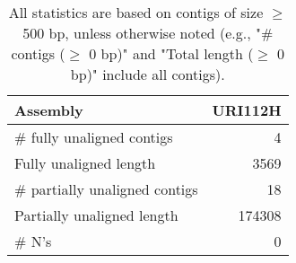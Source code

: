 \documentclass[12pt,a4paper]{article}
\begin{document}
\begin{table}[ht]
\begin{center}
\caption{All statistics are based on contigs of size $\geq$ 500 bp, unless otherwise noted (e.g., "\# contigs ($\geq$ 0 bp)" and "Total length ($\geq$ 0 bp)" include all contigs).}
\begin{tabular}{|l*{1}{|r}|}
\hline
Assembly & URI112H \\ \hline
\# fully unaligned contigs & 4 \\ \hline
Fully unaligned length & 3569 \\ \hline
\# partially unaligned contigs & 18 \\ \hline
Partially unaligned length & 174308 \\ \hline
\# N's & 0 \\ \hline
\end{tabular}
\end{center}
\end{table}
\end{document}
